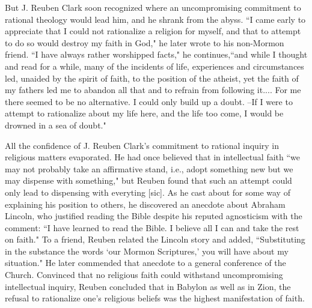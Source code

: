 But J. Reuben Clark soon recognized where an uncompromising commitment to 
rational theology would lead him, and he shrank from the abyss. 
``I came early to appreciate that I could not rationalize a religion for myself, 
and that to attempt to do so would destroy my faith in God," 
he later wrote to his non-Mormon friend. ``I have always rather worshipped 
facts," he continues,``and while I thought and read for a while, many of the 
incidents of life, experiences and circumstances led, unaided by the spirit of 
faith, to the position of the atheist, yet the faith of my fathers led me to 
abandon all that and to refrain from following it.... For me there seemed to be 
no alternative. I could only build up a doubt. --If I were to attempt to 
rationalize about my life here, and the life too come, I would be drowned in 
a sea of doubt."

All the confidence of J. Reuben Clark's commitment to rational inquiry in 
religious matters evaporated. He had once believed that in intellectual faith 
``we may not probably take an affirmative stand, i.e., adopt something new but 
we may dispense with something," but Reuben found that such an attempt could 
only lead to dispensing with everyting [sic]. As he cast about for some way of 
explaining his position to others, he discovered an anecdote about Abraham 
Lincoln, who justified reading the Bible despite his reputed agnosticism with 
the comment: ``I have learned to read the Bible. I believe all I can and take 
the rest on faith." To a friend, Reuben related the Lincoln story and added, 
``Substituting in the substance the words `our Mormon Scriptures,' you will 
have about my situation." He later commended that anecdote to a general 
conference of the Church. Convinced that no religious faith could withstand 
uncompromising intellectual inquiry, Reuben concluded that in Babylon as well 
as in Zion, the refusal to rationalize one's religious beliefs was the highest 
manifestation of faith.

\cite{clark}